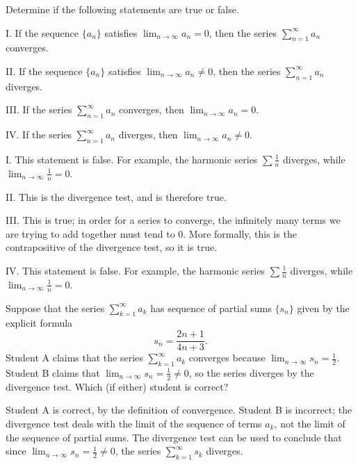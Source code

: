\documentclass[noauthor]{ximera}
\begin{document}
\begin{problem}
Determine if the following statements are true or false.

I. If the sequence $\{a_n\}$ satisfies $\lim_{n\rightarrow \infty} a_n = 0$, then the series $\sum_{n=1}^\infty a_n$ converges.

II. If the sequence $\{a_n\}$ satisfies $\lim_{n \rightarrow \infty} a_n \neq 0$, then the series $\sum_{n=1}^\infty a_n$ diverges.

III. If the series $\sum_{n=1}^\infty a_n$ converges, then $\lim_{n\rightarrow \infty} a_n = 0$. 

IV. If the series $\sum_{n=1}^\infty a_n$ diverges, then $\lim_{n\rightarrow \infty} a_n \neq 0$. 



\begin{freeResponse}
I. This statement is false. For example, the harmonic series $\sum \frac{1}{n}$ diverges, while $\lim_{n \rightarrow \infty} \frac{1}{n} = 0$. 

II. This is the divergence test, and is therefore true.

III. This is true; in order for a series to converge, the infinitely many terms we are trying to add together must tend to $0$.  More formally, this is the contrapositive of the divergence test, so it is true.

IV. This statement is false. For example, the harmonic series $\sum \frac{1}{n}$ diverges, while $\lim_{n \rightarrow \infty} \frac{1}{n} = 0$. 
\end{freeResponse}
\end{problem}

\begin{problem}
Suppose that the series $\sum_{k=1}^\infty a_k$ has sequence of partial sums $\{s_n\}$ given by the explicit formula
$$
s_n = \frac{2n+1}{4n+3}.
$$
Student A claims that the series $\sum_{k=1}^\infty a_k$ converges because $\lim_{n \rightarrow \infty} s_n = \frac{1}{2}$. Student B claims that $\lim_{n\rightarrow \infty} s_n = \frac{1}{2} \neq 0$, so the series diverges by the divergence test. Which (if either) student is correct?

\begin{freeResponse}
Student A is correct, by the definition of convergence. Student B is incorrect; the divergence test deals with the limit of the sequence of  terms $a_k$, not the limit of the sequence of partial sums.  The divergence test can be used to conclude that since $\lim_{n\rightarrow \infty} s_n = \frac{1}{2} \neq 0$, the series $\sum_{k=1}^{\infty} s_k$ diverges.
\end{freeResponse}

\end{problem}
\end{document}
